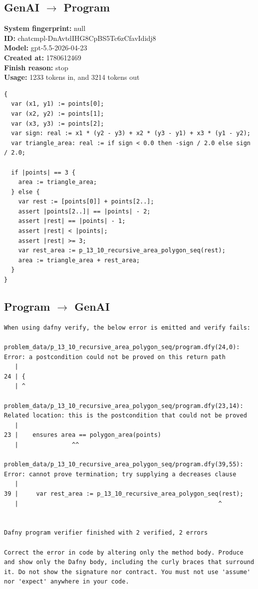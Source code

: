 \documentclass{article}
\begin{document}
\subsection*{GenAI $\rightarrow$ Program}
\textbf{System fingerprint: }null
\\\textbf{ID: }chatcmpl-DnAvtdIHG8CpBS5Tc6zCfavIdidj8
\\\textbf{Model: }gpt-5.5-2026-04-23
\\\textbf{Created at: }1780612469
\\\textbf{Finish reason: }stop
\\\textbf{Usage: }1233 tokens in, and 3214 tokens out
\begin{lstlisting}
{
  var (x1, y1) := points[0];
  var (x2, y2) := points[1];
  var (x3, y3) := points[2];
  var sign: real := x1 * (y2 - y3) + x2 * (y3 - y1) + x3 * (y1 - y2);
  var triangle_area: real := if sign < 0.0 then -sign / 2.0 else sign / 2.0;

  if |points| == 3 {
    area := triangle_area;
  } else {
    var rest := [points[0]] + points[2..];
    assert |points[2..]| == |points| - 2;
    assert |rest| == |points| - 1;
    assert |rest| < |points|;
    assert |rest| >= 3;
    var rest_area := p_13_10_recursive_area_polygon_seq(rest);
    area := triangle_area + rest_area;
  }
}
\end{lstlisting}
\subsection*{Program $\rightarrow$ GenAI}
\begin{lstlisting}
When using dafny verify, the below error is emitted and verify fails:

problem_data/p_13_10_recursive_area_polygon_seq/program.dfy(24,0): Error: a postcondition could not be proved on this return path
   |
24 | {
   | ^

problem_data/p_13_10_recursive_area_polygon_seq/program.dfy(23,14): Related location: this is the postcondition that could not be proved
   |
23 | 	ensures area == polygon_area(points)
   |               ^^

problem_data/p_13_10_recursive_area_polygon_seq/program.dfy(39,55): Error: cannot prove termination; try supplying a decreases clause
   |
39 |     var rest_area := p_13_10_recursive_area_polygon_seq(rest);
   |                                                        ^


Dafny program verifier finished with 2 verified, 2 errors

Correct the error in code by altering only the method body. Produce and show only the Dafny body, including the curly braces that surround it. Do not show the signature nor contract. You must not use 'assume' nor 'expect' anywhere in your code.
\end{lstlisting}
\end{document}
